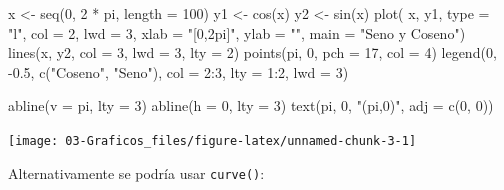 \documentclass[
]{book}
\newenvironment{Shaded}{\begin{snugshade}}{\end{snugshade}}
\newcommand{\AttributeTok}[1]{\textcolor[rgb]{0.77,0.63,0.00}{#1}}
\newcommand{\DecValTok}[1]{\textcolor[rgb]{0.00,0.00,0.81}{#1}}
\newcommand{\FloatTok}[1]{\textcolor[rgb]{0.00,0.00,0.81}{#1}}
\newcommand{\FunctionTok}[1]{\textcolor[rgb]{0.00,0.00,0.00}{#1}}
\newcommand{\NormalTok}[1]{#1}
\newcommand{\OtherTok}[1]{\textcolor[rgb]{0.56,0.35,0.01}{#1}}
\newcommand{\SpecialCharTok}[1]{\textcolor[rgb]{0.00,0.00,0.00}{#1}}
\newcommand{\StringTok}[1]{\textcolor[rgb]{0.31,0.60,0.02}{#1}}
\theoremstyle{break}
\begin{document}
\begin{Shaded}
\begin{Highlighting}[]
\NormalTok{x }\OtherTok{\textless{}{-}} \FunctionTok{seq}\NormalTok{(}\DecValTok{0}\NormalTok{, }\DecValTok{2} \SpecialCharTok{*}\NormalTok{ pi, }\AttributeTok{length =} \DecValTok{100}\NormalTok{)}
\NormalTok{y1 }\OtherTok{\textless{}{-}} \FunctionTok{cos}\NormalTok{(x)}
\NormalTok{y2 }\OtherTok{\textless{}{-}} \FunctionTok{sin}\NormalTok{(x)}
\FunctionTok{plot}\NormalTok{( x, y1, }\AttributeTok{type =} \StringTok{"l"}\NormalTok{, }\AttributeTok{col =} \DecValTok{2}\NormalTok{, }\AttributeTok{lwd =} \DecValTok{3}\NormalTok{, }\AttributeTok{xlab =} \StringTok{"[0,2pi]"}\NormalTok{, }\AttributeTok{ylab =} \StringTok{""}\NormalTok{, }\AttributeTok{main =} \StringTok{"Seno y Coseno"}\NormalTok{)}
\FunctionTok{lines}\NormalTok{(x, y2, }\AttributeTok{col =} \DecValTok{3}\NormalTok{, }\AttributeTok{lwd =} \DecValTok{3}\NormalTok{, }\AttributeTok{lty =} \DecValTok{2}\NormalTok{)}
\FunctionTok{points}\NormalTok{(pi, }\DecValTok{0}\NormalTok{, }\AttributeTok{pch =} \DecValTok{17}\NormalTok{, }\AttributeTok{col =} \DecValTok{4}\NormalTok{)}
\FunctionTok{legend}\NormalTok{(}\DecValTok{0}\NormalTok{, }\SpecialCharTok{{-}}\FloatTok{0.5}\NormalTok{, }\FunctionTok{c}\NormalTok{(}\StringTok{"Coseno"}\NormalTok{, }\StringTok{"Seno"}\NormalTok{), }\AttributeTok{col =} \DecValTok{2}\SpecialCharTok{:}\DecValTok{3}\NormalTok{, }\AttributeTok{lty =} \DecValTok{1}\SpecialCharTok{:}\DecValTok{2}\NormalTok{, }\AttributeTok{lwd =} \DecValTok{3}\NormalTok{)}

\FunctionTok{abline}\NormalTok{(}\AttributeTok{v =}\NormalTok{ pi, }\AttributeTok{lty =} \DecValTok{3}\NormalTok{)}
\FunctionTok{abline}\NormalTok{(}\AttributeTok{h =} \DecValTok{0}\NormalTok{, }\AttributeTok{lty =} \DecValTok{3}\NormalTok{)}
\FunctionTok{text}\NormalTok{(pi, }\DecValTok{0}\NormalTok{, }\StringTok{"(pi,0)"}\NormalTok{, }\AttributeTok{adj =} \FunctionTok{c}\NormalTok{(}\DecValTok{0}\NormalTok{, }\DecValTok{0}\NormalTok{))}
\end{Highlighting}
\end{Shaded}

\begin{center}\texttt{[image: 03-Graficos\_files/figure-latex/unnamed-chunk-3-1]} \end{center}

Alternativamente se podría usar \texttt{curve()}:
\end{document}
